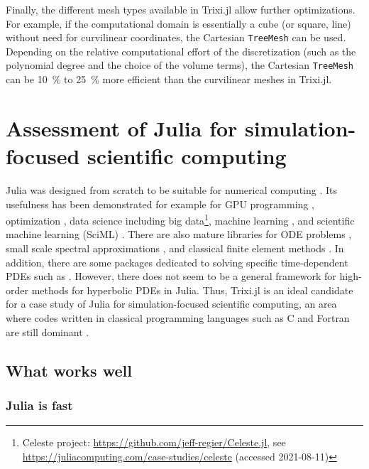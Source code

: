 \documentclass[hidelinks]{juliacon} %
\newcommand{\trixi}{Trixi.jl\xspace}
\begin{document}
Finally, the different mesh types available in \trixi allow further optimizations.
For example, if the computational domain is essentially a cube (or square, line)
without need for curvilinear coordinates, the Cartesian \lstinline{TreeMesh} can
be used. Depending on the relative computational effort of the discretization
(such as the polynomial degree and the choice of the volume terms), the
Cartesian \lstinline{TreeMesh} can be \SI{10}{\percent} to \SI{25}{\percent}
more efficient than the curvilinear meshes in \trixi.

\section{Assessment of Julia for simulation-focused scientific computing}
\label{sec:assessment-of-julia}

Julia was designed from scratch to be suitable for numerical computing
\cite{bezanson2017julia}. Its usefulness has been demonstrated for example for
GPU programming \cite{besard2018juliagpu, omlin2020solving},
optimization \cite{dunning2017jump}, data science including
big data\footnote{Celeste project: \url{https://github.com/jeff-regier/Celeste.jl},
see \url{https://juliacomputing.com/case-studies/celeste} (accessed 2021-08-11)},
machine learning \cite{innes2018fashionable}, and scientific machine learning
(SciML) \cite{pal2021opening}. There are also mature libraries for ODE problems
\cite{rackauckas2017differentialequations}, small scale spectral approximations
\cite{olver2014practical}, and classical finite element methods \cite{badia2020gridap}.
In addition, there are some packages dedicated to solving specific time-dependent
PDEs such as \cite{ramadhan2020oceananigans, constantinou2021geophysicalflows}.
However, there does not seem to be a general framework for high-order methods
for hyperbolic PDEs in Julia. Thus, \trixi is an ideal candidate for a case study
of Julia for simulation-focused scientific computing, an area where codes written
in classical programming languages such as C and Fortran are still dominant
\cite{krais2021flexi, parsani2021ssdc}.

\subsection{What works well}

\subsubsection{Julia is fast}
\end{document}
